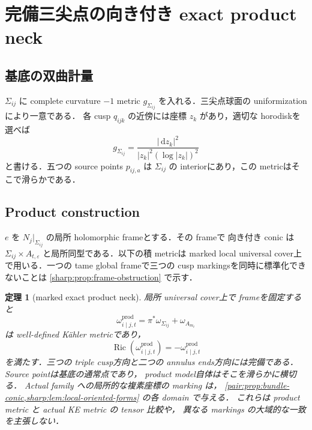 \documentclass[a4paper,11pt]{ltjsarticle}
\numberwithin{equation}{section}
\theoremstyle{plain}
\newtheorem{theorem}{定理}[section]
\theoremstyle{definition}
\theoremstyle{remark}
\newcommand{\eps}{\varepsilon}\newcommand{\dd}{\,\mathrm d}\newcommand{\ddc}{\sqrt{-1}\,\partial\bar\partial}
\newcommand{\Ric}{\operatorname{Ric}}\newcommand{\tr}{\operatorname{tr}}\newcommand{\osc}{\operatorname{osc}}\newcommand{\vol}{\operatorname{Vol}}
\begin{document}
\section{完備三尖点の向き付き exact product neck}\label{sharp:sec:exact-neck}

\subsection{基底の双曲計量}

$\Sigma_{ij}$ に complete curvature $-1$ metric $g_{\Sigma_{ij}}$ を入れる．三尖点球面の uniformizationにより一意である．
各 cusp $q_{ijk}$ の近傍には座標 $z_k$ があり，適切な horodiskを選べば
\begin{equation}\label{sharp:eq:base-cusp}
 g_{\Sigma_{ij}}
 =\frac{|\dd z_k|^2}{|z_k|^2(\log|z_k|)^2}
\end{equation}
と書ける．五つの source points $p_{ij,a}$ は $\Sigma_{ij}$ の interiorにあり，この metricはそこで滑らかである．

\subsection{Product construction}

$e$ を $N_j|_{\Sigma_{ij}}$ の局所 holomorphic frameとする．その frameで
向き付き conic は $\Sigma_{ij}\times A_{t,\eps}$ と局所同型である．以下の積 metricは
marked local universal cover上で用いる．一つの tame global frameで三つの cusp markingsを同時に標準化できないことは
\cref{sharp:prop:frame-obstruction} で示す．

\begin{theorem}[marked exact product neck]\label{sharp:thm:exact-oriented-neck}
局所 universal cover上で frameを固定すると
\begin{equation}\label{sharp:eq:product-neck-metric}
 \omega_{i\mid j,t}^{\mathrm{prod}}
 =\pi^*\omega_{\Sigma_{ij}}+\omega_{A_{m_t}}
\end{equation}
は well-defined Kähler metricであり，
\begin{equation}\label{sharp:eq:product-KE}
 \Ric(\omega_{i\mid j,t}^{\mathrm{prod}})
 =-\omega_{i\mid j,t}^{\mathrm{prod}}
\end{equation}
を満たす．三つの triple cusp方向と二つの annulus ends方向には完備である．Source pointは基底の通常点であり，
product model自体はそこを滑らかに横切る．
Actual family への局所的な複素座標の marking は，
\cref{pair:prop:bundle-conic,sharp:lem:local-oriented-forms} の各 domain で与える．
これらは product metric と actual KE metric の tensor 比較や，
異なる markings の大域的な一致を主張しない．
\end{theorem}
\end{document}
